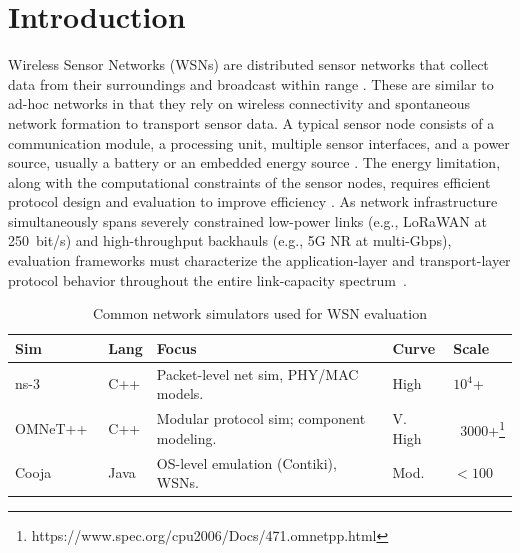 \documentclass[jsan,article,submit,moreauthors,pdftex]{Definitions/mdpi}
\begin{document}
\setlength{\headheight}{20.0pt}
\nolinenumbers



\section{Introduction}
\label{sec:introduction}
Wireless Sensor Networks (WSNs) are distributed sensor networks that collect data from their surroundings and broadcast within range \cite{YICK20082292, matin2012overview}. These are similar to ad-hoc networks \cite{ramanathan2002brief} in that they rely on wireless connectivity and spontaneous network formation to transport sensor data. A typical sensor node consists of a communication module, a processing unit, multiple sensor interfaces, and a power source, usually a battery or an embedded energy source \cite{5522465}. The energy limitation, along with the computational constraints of the sensor nodes, requires efficient protocol design and evaluation to improve efficiency \cite{saginbekov2016testing}. As network infrastructure simultaneously spans severely constrained low-power links (e.g., LoRaWAN at 250 \,bit/s) and high-throughput backhauls (e.g., 5G NR at multi-Gbps), evaluation frameworks must characterize the application-layer and transport-layer protocol behavior throughout the entire link-capacity spectrum~\cite{fi15110348}.

\begin{table}[ht]
\centering
\footnotesize
\caption{Common network simulators used for WSN evaluation}
\renewcommand{\arraystretch}{1.3}
\begin{tabularx}{\columnwidth}{l l X l l}
\hline
\textbf{Sim} & \textbf{Lang} & \textbf{Focus} & \textbf{Curve} & \textbf{Scale} \\
\hline
ns-3~\cite{riley2010ns} & C++ & Packet-level net sim, PHY/MAC models. & High & $10^4$+ \\
OMNeT++~\cite{varga2008overview}& C++ & Modular protocol sim; component modeling. & V. High & \ 3000+\footnote{https://www.spec.org/cpu2006/Docs/471.omnetpp.html} \\
Cooja  ~\cite{velinov2016running} & Java & OS-level emulation (Contiki), WSNs. & Mod. & $<100$ \\
\hline
\end{tabularx}

\label{tab:simulator-limits}
\end{table}
\end{document}
